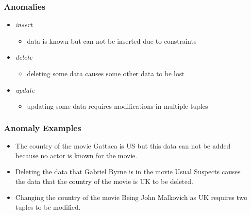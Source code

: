 \documentclass[dvipsnames]{beamer}
\begin{document}
\begin{frame}
  \frametitle{Anomalies}

  \begin{itemize}
    \item \emph{insert}
    \begin{itemize}
      \item data is known but can not be inserted due to constraints
    \end{itemize}

    \pause
    \item \emph{delete}
    \begin{itemize}
        \item deleting some data causes some other data to be lost
    \end{itemize}

    \pause
    \item \emph{update}
    \begin{itemize}
      \item updating some data requires modifications in multiple tuples
    \end{itemize}
  \end{itemize}
\end{frame}

\begin{frame}
  \frametitle{Anomaly Examples}

  \begin{example}
    \begin{itemize}
      \item The country of the movie Gattaca is US but this data can not be
        added because no actor is known for the movie.

      \pause
      \item Deleting the data that Gabriel Byrne is in the movie Usual Suspects
        causes the data that the country of the movie is UK to be deleted.

      \pause
      \item Changing the country of the movie Being John Malkovich as UK
        requires two tuples to be modified.
    \end{itemize}
  \end{example}
\end{frame}
\end{document}
